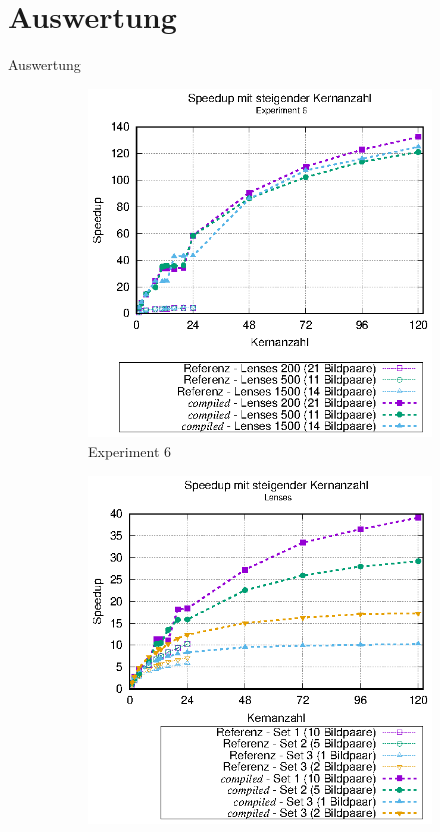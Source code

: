 \section{Auswertung}

\begin{frame}{Auswertung}
	\begin{center}
		\begin{figure}[h]
			\begin{subfigure}[b]{0.45\textwidth}
				\centering
				\includegraphics[width=\textwidth]{pdf/best_speedup_exp6}
				\caption{Experiment 6}
			\end{subfigure}
			\hfill
			\begin{subfigure}[b]{0.45\textwidth}
				\centering
				\includegraphics[width=\textwidth]{pdf/best_speedup_lenses}

\end{subfigure}
\end{figure}
\end{center}
\end{frame}
